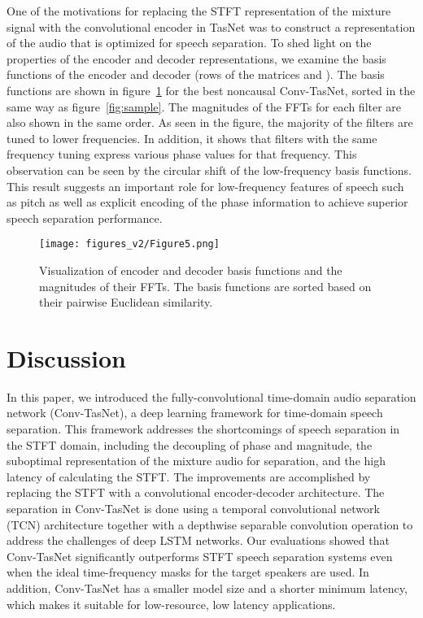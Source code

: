 \documentclass[journal]{IEEEtran}
\begin{document}
One of the motivations for replacing the STFT representation of the mixture signal with the convolutional encoder in TasNet was to construct a representation of the audio that is optimized for speech separation. To shed light on the properties of the encoder and decoder representations, we examine the basis functions of the encoder and decoder (rows of the matrices  and ). The basis functions are shown in figure~\ref{fig:basis} for the best noncausal Conv-TasNet, sorted in the same way as figure~\ref{fig:sample}. The magnitudes of the FFTs for each filter are also shown in the same order. As seen in the figure, the majority of the filters are tuned to lower frequencies. In addition, it shows that filters with the same frequency tuning express various phase values for that frequency. This observation can be seen by the circular shift of the low-frequency basis functions. This result suggests an important role for low-frequency features of speech such as pitch as well as explicit encoding of the phase information to achieve superior speech separation performance.  

\begin{figure}[!htbp]
	\small
	\centering
	\texttt{[image: figures\_v2/Figure5.png]}
	\caption{Visualization of encoder and decoder basis functions and the magnitudes of their FFTs. The basis functions are sorted based on their pairwise Euclidean similarity.}
	\label{fig:basis}
\end{figure}

 

\section{Discussion}
\label{sec:conclude}
In this paper, we introduced the fully-convolutional time-domain audio separation network (Conv-TasNet), a deep learning framework for time-domain speech separation. This framework addresses the shortcomings of speech separation in the STFT domain, including the decoupling of phase and magnitude, the suboptimal representation of the mixture audio for separation, and the high latency of calculating the STFT. The improvements are accomplished by replacing the STFT with a convolutional encoder-decoder architecture. The separation in Conv-TasNet is done using a temporal convolutional network (TCN) architecture together with a depthwise separable convolution operation to address the challenges of deep LSTM networks. Our evaluations showed that Conv-TasNet significantly outperforms STFT speech separation systems even when the ideal time-frequency masks for the target speakers are used. In addition, Conv-TasNet has a smaller model size and a shorter minimum latency, which makes it suitable for low-resource, low latency applications.
\end{document}
